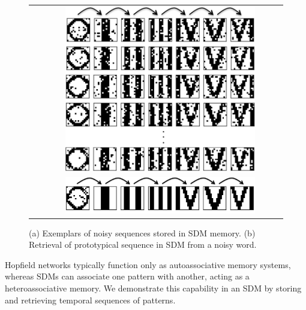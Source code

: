 \documentclass[10pt,letterpaper]{article}
\begin{document}
\begin{figure}[t!]
  \begin{center}
    \begin{tabular}{ l c }
      \raisebox{4.1in}{(a)} &
      \includegraphics[width=0.8\textwidth]{./figures/exemplarStoredSequences.png} \vspace{25bp} 
      \\
      \raisebox{.6in}{(b)} &
      \includegraphics[width=0.8\textwidth]{./figures/prototypeRetrievedSequence.png} 
    \end{tabular}
    \caption{(a) Exemplars of noisy sequences stored in SDM
      memory. (b) Retrieval of prototypical sequence in SDM from a
      noisy word.}
    \label{sequences}
  \end{center}
\end{figure}

Hopfield networks typically function only as autoassociative memory systems, whereas SDMs can associate one pattern with another, acting as a heteroassociative memory. We demonstrate this capability in an SDM by storing and retrieving temporal sequences of patterns.
\end{document}
